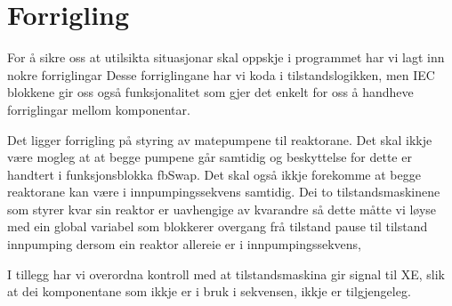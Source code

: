 \section{Forrigling}
\thispagestyle{fancy}

For å sikre oss at utilsikta situasjonar skal oppskje i programmet har vi lagt inn nokre forriglingar
Desse forriglingane har vi koda i tilstandslogikken, 
men IEC blokkene gir oss også funksjonalitet som gjer det enkelt for oss å handheve forriglingar mellom komponentar.

Det ligger forrigling på styring av matepumpene til reaktorane. Det skal ikkje være mogleg at at begge pumpene går samtidig
og beskyttelse for dette er handtert i funksjonsblokka fbSwap. 
Det skal også ikkje forekomme at begge reaktorane kan være i innpumpingssekvens samtidig.
Dei to tilstandsmaskinene som styrer kvar sin reaktor er uavhengige av kvarandre så dette måtte vi løyse med ein
global variabel som blokkerer overgang frå tilstand pause til tilstand innpumping dersom ein reaktor allereie er i innpumpingssekvens,

I tillegg har vi overordna kontroll med at tilstandsmaskina gir signal til XE, 
slik at dei komponentane som ikkje er i bruk i sekvensen, ikkje er tilgjengeleg.



\newpage








